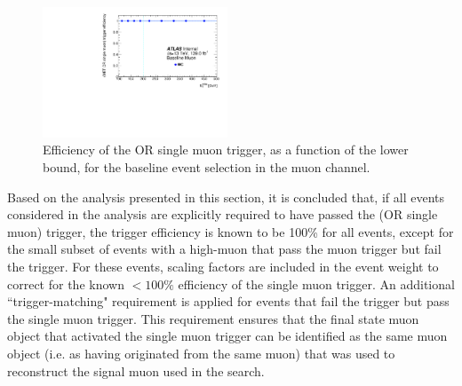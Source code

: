   \begin{figure}[htbp]
  \centering
     \includegraphics[width = 0.49\textwidth]{Figures/5/efficiency_baseline_muon_leptrig.pdf}
     \caption{Efficiency of the \met OR single muon trigger, as a function of the \met lower bound, for the baseline event selection in the muon channel.}
     \label{fig:trigger_OR}
  \end{figure}

Based on the analysis presented in this section, it is concluded that, if all events considered in the analysis are explicitly required to have passed the (\met OR single muon) trigger, the trigger efficiency is known to be 100\% for all events, except for the small subset of events with a high-\pt muon that pass the muon trigger but fail the \met trigger. For these events, scaling factors are included in the event weight to correct for the known \(<100\%\) efficiency of the single muon trigger. An additional ``trigger-matching" requirement is applied for events that fail the \met trigger but pass the single muon trigger. This requirement ensures that the final state muon object that activated the single muon trigger can be identified as the same muon object (i.e. as having originated from the same muon) that was used to reconstruct the signal muon used in the search. 
